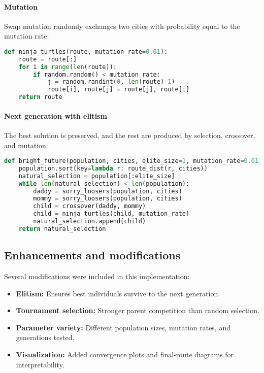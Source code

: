 \documentclass[conference]{IEEEtran}
\begin{document}
\paragraph{Mutation}
Swap mutation randomly exchanges two cities with probability equal to the mutation rate:
\begin{lstlisting}[language=Python]
def ninja_turtles(route, mutation_rate=0.01):
    route = route[:]
    for i in range(len(route)):
        if random.random() < mutation_rate:
            j = random.randint(0, len(route)-1)
            route[i], route[j] = route[j], route[i]
    return route
\end{lstlisting}

\paragraph{Next generation with elitism}
The best solution is preserved, and the rest are produced by selection, crossover, and mutation:
\begin{lstlisting}[language=Python]
def bright_future(population, cities, elite_size=1, mutation_rate=0.01):
    population.sort(key=lambda r: route_dist(r, cities))
    natural_selection = population[:elite_size]
    while len(natural_selection) < len(population):
        daddy = sorry_loosers(population, cities)
        mommy = sorry_loosers(population, cities)
        child = crossover(daddy, mommy)
        child = ninja_turtles(child, mutation_rate)
        natural_selection.append(child)
    return natural_selection
\end{lstlisting}

\subsection{Enhancements and modifications}
Several modifications were included in this implementation:
\begin{itemize}
    \item \textbf{Elitism:} Ensures best individuals survive to the next generation.
    \item \textbf{Tournament selection:} Stronger parent competition than random selection.
    \item \textbf{Parameter variety:} Different population sizes, mutation rates, and generations tested.
    \item \textbf{Visualization:} Added convergence plots and final-route diagrams for interpretability.
\end{itemize}
\end{document}
